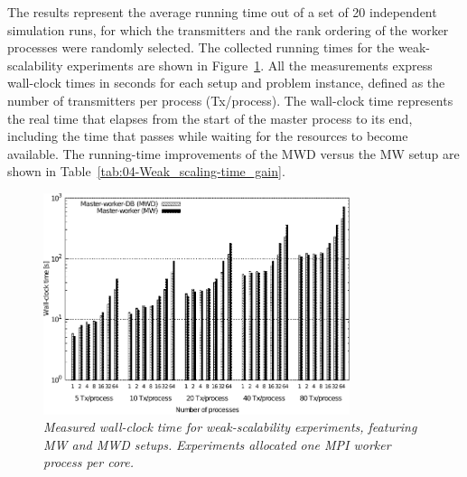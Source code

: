 The results represent the average running time out of a set of 20
independent simulation runs, for which the transmitters and the rank
ordering of the worker processes were randomly selected. The collected
running times for the weak-scalability experiments are shown in Figure~\ref{fig:04-Weak_scalability_time}.
All the measurements express wall-clock times in seconds for each
setup and problem instance, defined as the number of transmitters
per process (Tx/process). The wall-clock time represents the real
time that elapses from the start of the master process to its end,
including the time that passes while waiting for the resources to
become available. The running-time improvements of the MWD versus
the MW setup are shown in Table~\ref{tab:04-Weak_scaling-time_gain}.

\begin{figure}
\centering

\includegraphics[width=0.8\textwidth]{04-framework_design_and_implementation/img/weak_scaling-time_plot}

\caption{\textit{\emph{Measured wall-clock time for weak-scalability experiments,
featuring MW and MWD setups.}}\textit{ }\textit{\emph{Experiments
allocated one MPI worker process per core.\label{fig:04-Weak_scalability_time}}}}
\end{figure}


